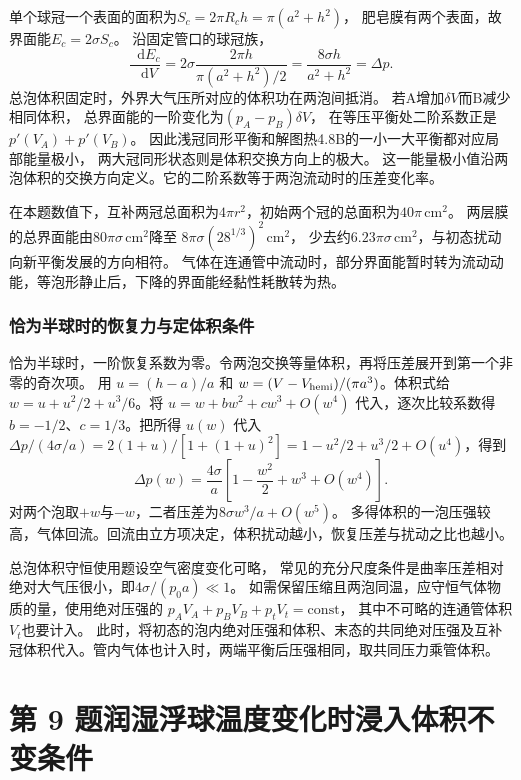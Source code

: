 \documentclass[UTF8,fontset=fandol,a4paper,11pt]{ctexart}
\newcommand{\dd}{\mathop{}\!\mathrm{d}}
\begin{document}
单个球冠一个表面的面积为$S_c=2\pi R_ch=\pi(a^2+h^2)$，
肥皂膜有两个表面，故界面能$E_c=2\sigma S_c$。
沿固定管口的球冠族，
\[
\frac{\dd E_c}{\dd V}
=2\sigma\frac{2\pi h}{\pi(a^2+h^2)/2}
=\frac{8\sigma h}{a^2+h^2}=\Delta p.
\]
总泡体积固定时，外界大气压所对应的体积功在两泡间抵消。
若A增加$\delta V$而B减少相同体积，
总界面能的一阶变化为$(p_A-p_B)\delta V$，
在等压平衡处二阶系数正是$p'(V_A)+p'(V_B)$。
因此浅冠同形平衡和解图热4.8B的一小一大平衡都对应局部能量极小，
两大冠同形状态则是体积交换方向上的极大。
这一能量极小值沿两泡体积的交换方向定义。它的二阶系数等于两泡流动时的压差变化率。

在本题数值下，互补两冠总面积为$4\pi r^2$，初始两个冠的总面积为$40\pi\,\mathrm{cm^2}$。
两层膜的总界面能由$80\pi\sigma\,\mathrm{cm^2}$降至
$8\pi\sigma(28^{1/3})^2\,\mathrm{cm^2}$，
少去约$6.23\pi\sigma\,\mathrm{cm^2}$，与初态扰动向新平衡发展的方向相符。
气体在连通管中流动时，部分界面能暂时转为流动动能，等泡形静止后，下降的界面能经黏性耗散转为热。

\subsubsection*{恰为半球时的恢复力与定体积条件}
恰为半球时，一阶恢复系数为零。令两泡交换等量体积，再将压差展开到第一个非零的奇次项。
用 $u=(h-a)/a$ 和 $w=(V-V_{\rm hemi})/(\pi a^3)$。体积式给 $w=u+u^2/2+u^3/6$。将 $u=w+bw^2+cw^3+O(w^4)$ 代入，逐次比较系数得 $b=-1/2$、$c=1/3$。把所得 $u(w)$ 代入 $\Delta p/(4\sigma/a)=2(1+u)/[1+(1+u)^2]=1-u^2/2+u^3/2+O(u^4)$，得到
\[
\Delta p(w)=\frac{4\sigma}{a}
\left[1-\frac{w^2}{2}+w^3+O(w^4)\right].
\]
对两个泡取$+w$与$-w$，二者压差为$8\sigma w^3/a+O(w^5)$。
多得体积的一泡压强较高，气体回流。回流由立方项决定，体积扰动越小，恢复压差与扰动之比也越小。

总泡体积守恒使用题设空气密度变化可略，
常见的充分尺度条件是曲率压差相对绝对大气压很小，即$4\sigma/(p_0a)\ll1$。
如需保留压缩且两泡同温，应守恒气体物质的量，使用绝对压强的
$p_AV_A+p_BV_B+p_tV_t=\mathrm{const}$，
其中不可略的连通管体积$V_t$也要计入。
此时，将初态的泡内绝对压强和体积、末态的共同绝对压强及互补冠体积代入。管内气体也计入时，两端平衡后压强相同，取共同压力乘管体积。




\section*{第 9 题\quad 润湿浮球温度变化时浸入体积不变条件}
\end{document}
